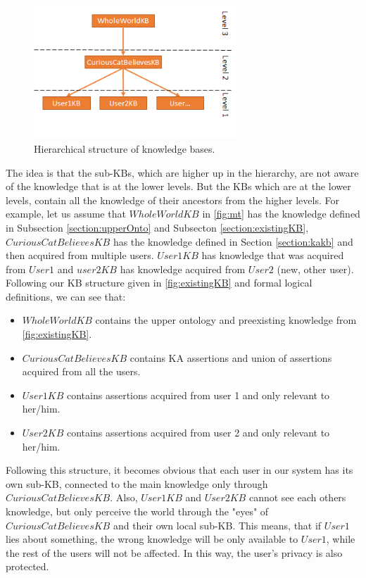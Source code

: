 \begin{figure}[H]
	\centering
		\includegraphics[width=0.68\textwidth]{figures/microtheories.png}
	\caption{Hierarchical structure of knowledge bases.}
	\label{fig:mt}
\end{figure}

The idea is that the sub-KBs, which are higher up in the hierarchy, are not aware of the knowledge that is at the lower levels. But the KBs which are at the lower levels, contain all the knowledge of their ancestors from the higher levels. For example,  let us assume that $WholeWorldKB$  in \autoref{fig:mt} has the knowledge defined in Subsection \ref{section:upperOnto} and 
Subsecton \ref{section:existingKB}, $CuriousCatBelievesKB$ has the knowledge defined in Section \ref{section:kakb} and then acquired from multiple users. 
$User1KB$ has knowledge that was acquired from $User1$ and $user2KB$ has 
knowledge acquired from $User2$ (new, other user). Following our KB structure 
given in \autoref{fig:existingKB} and formal logical definitions, 
we can see that:
\begin{itemize}
\item $WholeWorldKB$ contains the upper ontology and preexisting knowledge 
from \autoref{fig:existingKB}.
\item $CuriousCatBelievesKB$ contains KA assertions and union of assertions 
acquired from all the users.
\item $User1KB$ contains assertions acquired from user 1 and only relevant to 
her/him.
\item $User2KB$ contains assertions acquired from user 2 and only relevant to 
her/him.
\end{itemize}

Following this structure, it becomes obvious that each user in our system has 
its own sub-KB, connected to the main knowledge only through 
$CuriousCatBelievesKB$. Also, $User1KB$ and $User2KB$ cannot see each others 
knowledge, but only perceive the world through the "eyes" of 
$CuriousCatBelievesKB$ and their own local sub-KB. This means, that if $User1$ 
lies about something, the wrong knowledge will be only available to $User1$, 
while the rest of the users will not be affected. In this way, the user's privacy
is also protected.

